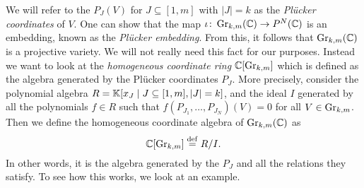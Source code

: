 We will refer to the $P_J(V)$ for $J \subseteq [1,m]$ with $|J| = k$ as the
\emph{Plücker coordinates} of $V$. One can show that the map
$\iota \colon \operatorname{Gr}_{k, m}(\mathbb{C}) \to P^N(\mathbb{C})$ is an embedding, known as the
\emph{Plücker embedding}. From this, it follows that
$\operatorname{Gr}_{k,m}(\mathbb{C})$ is a projective variety. We will not really need this fact for our
purposes. Instead we want to look at the \emph{homogeneous coordinate
	ring} $\mathbb{C}[\operatorname{Gr}_{k,m}]$ which is defined as the
algebra generated by the Plücker coordinates $P_J$. More precisely, consider the
polynomial algebra $R = \mathbb{K}[x_J \mid J\subseteq [1, m], |J| = k]$, and the ideal $I$
generated by all the polynomials $f \in R$ such that $f(P_{J_1}, \dots, P_{J_N})(V) =
	0$ for all $V \in \operatorname{Gr}_{k, m}$. Then we define the homogeneous coordinate algebra of
$\operatorname{Gr}_{k,m}(\mathbb{C})$ as
\begin{equation*}
	\mathbb{C}[\operatorname{Gr}_{k,m}] \overset{\mathrm{def}}{=} R / I.
\end{equation*}
%
In other words, it is the algebra generated by the $P_J$ and all the relations they
satisfy. To see how this works, we look at an example.

